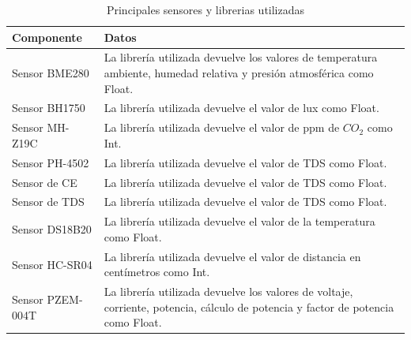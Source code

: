 \begin{table}[h]
    \centering
    \caption[Principales sensores y librerias utilizadas]{Principales sensores y librerias utilizadas}
    \begin{tabular}{p{3.2cm}p{9.6cm}}
        \toprule
        \textbf{Componente}               & \textbf{Datos}                                                   \\
        \midrule
        \multirow{1}{*}{Sensor BME280}    & La librería utilizada \cite{BME280_MicroPython_Driver} devuelve
        los valores de temperatura ambiente, humedad relativa y presión atmosférica como Float.              \\
        \multirow{1}{*}{Sensor BH1750}    & La librería utilizada \cite{BH1750_MicroPython_Driver} devuelve
        el valor de lux como Float.                                                                          \\
        \multirow{1}{*}{Sensor MH-Z19C}   & La librería utilizada \cite{MHZ19_MicroPython_Driver} devuelve
        el valor de ppm de $CO_2$ como Int.                                                                  \\
        \multirow{1}{*}{Sensor PH-4502}   & La librería utilizada \cite{PH_Sensor_Driver} devuelve
        el valor de TDS como Float.                                                                          \\
        \multirow{1}{*}{Sensor de CE}     & La librería utilizada \cite{EC_Sensor_Driver} devuelve
        el valor de TDS como Float.                                                                          \\
        \multirow{1}{*}{Sensor de TDS}    & La librería utilizada \cite{TDS_Sensor_Driver} devuelve
        el valor de TDS como Float.                                                                          \\
        \multirow{1}{*}{Sensor DS18B20}   & La librería utilizada \cite{DS18B20_MicroPython_Driver} devuelve
        el valor de la temperatura como Float.                                                               \\
        \multirow{1}{*}{Sensor HC-SR04}   & La librería utilizada \cite{HCSR04_Sensor_Driver} devuelve
        el valor de distancia en centímetros como Int.                                                       \\
        \multirow{1}{*}{Sensor PZEM-004T} & La librería utilizada \cite{PZEM004T_Sensor_Driver} devuelve
        los valores de voltaje, corriente, potencia, cálculo de potencia y factor de potencia como Float.    \\
        \bottomrule
        \hline
    \end{tabular}
    \label{tab:sensores y librerias}
\end{table}

